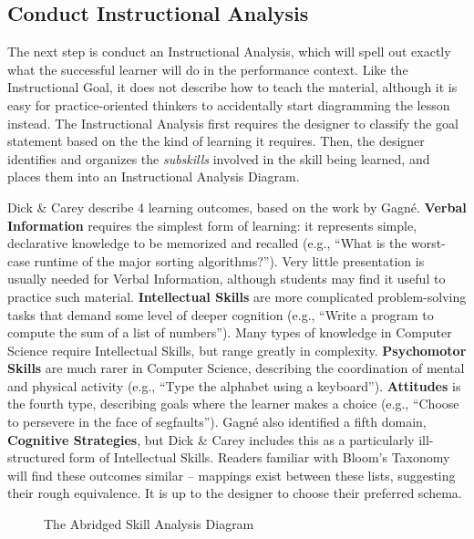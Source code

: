 \documentclass{sig-alternate}
\begin{document}
\subsection{Conduct Instructional Analysis}

The next step is conduct an Instructional Analysis, which will spell out exactly what the successful learner will do in the performance context.
Like the Instructional Goal, it does not describe how to teach the material, although it is easy for practice-oriented thinkers to accidentally start diagramming the lesson instead.
The Instructional Analysis first requires the designer to classify the goal statement based on the the kind of learning it requires.
Then, the designer identifies and organizes the \textit{subskills} involved in the skill being learned, and places them into an Instructional Analysis Diagram.

Dick \& Carey describe 4 learning outcomes, based on the work by Gagn\'{e}.
\textbf{Verbal Information} requires the simplest form of learning: it represents simple, declarative knowledge to be memorized and recalled (e.g., ``What is the worst-case runtime of the major sorting algorithms?'').
Very little presentation is usually needed for Verbal Information, although students may find it useful to practice such material.
\textbf{Intellectual Skills} are more complicated problem-solving tasks that demand some level of deeper cognition (e.g., ``Write a program to compute the sum of a list of numbers'').
Many types of knowledge in Computer Science require Intellectual Skills, but range greatly in complexity.
\textbf{Psychomotor Skills} are much rarer in Computer Science, describing the coordination of mental and physical activity (e.g., ``Type the alphabet using a keyboard'').
\textbf{Attitudes} is the fourth type, describing goals where the learner makes a choice (e.g., ``Choose to persevere in the face of segfaults'').
Gagn\'{e} also identified a fifth domain, \textbf{Cognitive Strategies}, but Dick \& Carey includes this as a particularly ill-structured form of Intellectual Skills.
Readers familiar with Bloom's Taxonomy will find these outcomes similar -- mappings exist between these lists, suggesting their rough equivalence.
It is up to the designer to choose their preferred schema.

\begin{figure*}
\begin{center}
\end{center}
\vspace{-\bigskipamount}
\caption{The Abridged Skill Analysis Diagram}
\label{fig-sa}
\end{figure*}
\end{document}
